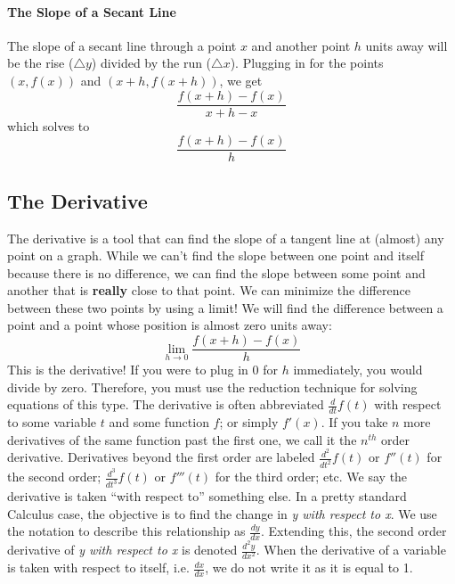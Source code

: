 \documentclass[../revisedmain.tex]{subfiles}
\begin{document}
	\paragraph{The Slope of a Secant Line} The slope of a secant line through a point $x$ and another point $h$ units away will be the rise ($\triangle y$) divided by the run ($\triangle x$). Plugging in for the points $(x,f(x))$ and $(x+h,f(x+h))$, we get $$\frac{f(x+h)-f(x)}{x+h-x}$$which solves to$$\frac{f(x+h)-f(x)}{h}$$
	\subsection{The Derivative}
	\par The derivative is a tool that can find the slope of a tangent line at (almost) any point on a graph. While we can't find the slope between one point and itself because there is no difference, we can find the slope between some point and another that is \textbf{really} close to that point. We can minimize the difference between these two points by using a limit! We will find the difference between a point and a point whose position is almost zero units away: $$\lim_{h\to 0} \frac{f(x+h)-f(x)}{h}$$ This is the derivative! If you were to plug in 0 for $h$ immediately, you would divide by zero. Therefore, you must use the reduction technique for solving equations of this type. The derivative is often abbreviated $\displaystyle\frac{d}{dt} f(t)$ with respect to some variable $t$ and some function $f$; or simply $f'(x)$. If you take $n$ more derivatives of the same function past the first one, we call it the $n^{th}$ order derivative. Derivatives beyond the first order are labeled $\displaystyle\frac{d^2}{dt^2} f(t)$ or $f''(t)$ for the second order; $\displaystyle\frac{d^3}{dt^3} f(t)$ or $f'''(t)$ for the third order; etc. We say the derivative is taken ``with respect to'' something else. In a pretty standard Calculus case, the objective is to find the change in  \textit{y with respect to x}. We use the notation to describe this relationship as $\displaystyle\frac{dy}{dx}$. Extending this, the second order derivative of \textit{y with respect to x} is denoted $\displaystyle\frac{d^2y}{dx^2}$. When the derivative of a variable is taken with respect to itself, i.e. $\displaystyle\frac{dx}{dx}$, we do not write it as it is equal to 1.
	\newline
\end{document}
